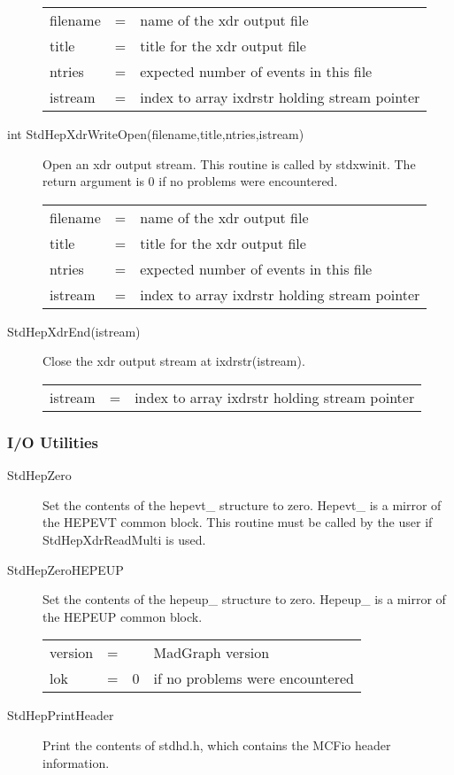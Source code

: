 \begin{description}
\begin{tabular}{lcl}
filename & = & name of the xdr output file \\
title & = & title for the xdr output file \\
ntries & = & expected number of events in this file \\
istream & = & index to array ixdrstr holding stream pointer \\
\end{tabular}

\item[int StdHepXdrWriteOpen(filename,title,ntries,istream)]
 Open an xdr output stream.
 This routine is called by stdxwinit.
 The return argument is 0 if no problems were encountered.

\begin{tabular}{lcl}
filename & = & name of the xdr output file \\
title & = & title for the xdr output file \\
ntries & = & expected number of events in this file \\
istream & = & index to array ixdrstr holding stream pointer \\
\end{tabular}

\item[StdHepXdrEnd(istream)] 
 Close the xdr output stream at ixdrstr(istream).

\begin{tabular}{lcl}
istream & = & index to array ixdrstr holding stream pointer \\
\end{tabular}

\end{description}

\subsubsection{I/O Utilities}

\begin{description}

\item[StdHepZero]
 Set the contents of the hepevt\_ structure to zero. 
 Hepevt\_ is a mirror of the HEPEVT common block.
 This routine must be called by the user if StdHepXdrReadMulti is used.

\item[StdHepZeroHEPEUP]
 Set the contents of the hepeup\_ structure to zero. 
 Hepeup\_ is a mirror of the HEPEUP common block.

\begin{tabular}{lcll}
version & = &  & MadGraph version \\
lok  & = & 0  & if no problems were encountered \\
\end{tabular}

\item[StdHepPrintHeader]
 Print the contents of stdhd.h, which contains the MCFio header information.

\end{description}



